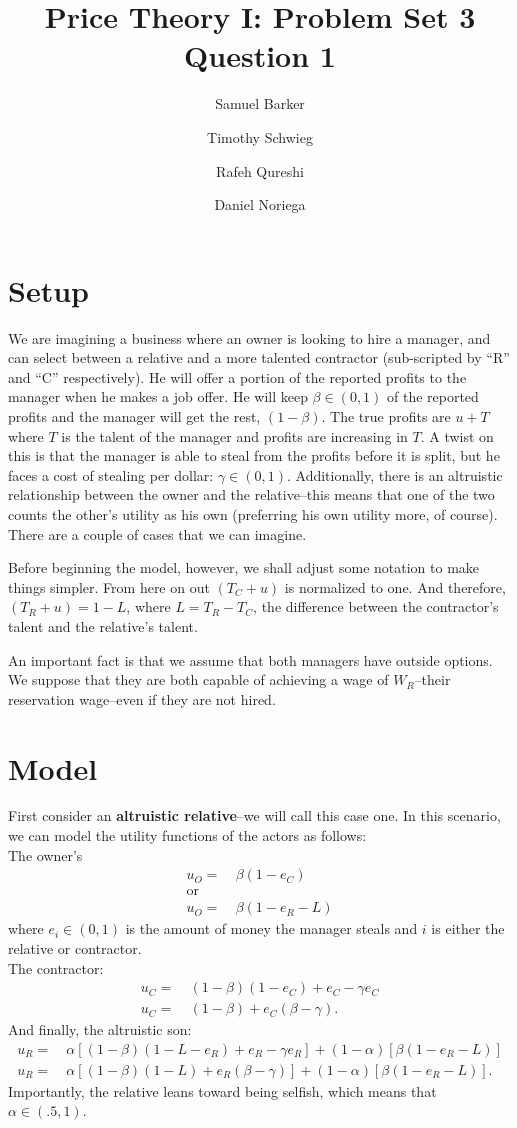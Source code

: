\documentclass[12pt]{paper}
\title{Price Theory I: Problem Set 3 Question 1}
\author{Samuel Barker\and Timothy Schwieg\and Rafeh Qureshi\and Daniel Noriega}
\begin{document}
\maketitle

\section{Setup}
We are imagining a business where an owner is looking to hire a
manager, and can select between a relative and a more talented
contractor (sub-scripted by ``R'' and ``C'' respectively). He will offer
a portion of the reported profits to the manager when he makes a job
offer. He will keep $\beta \in (0,1)$ of the reported profits and the
manager will get the rest, $(1-\beta)$. The true profits are $u+T$ where
$T$ is the talent of the manager and profits are increasing in $T$. A
twist on this is that the manager is able to steal from the profits
before it is split, but he faces a cost of stealing per dollar:
$\gamma \in (0,1)$. Additionally, there is an altruistic relationship between
the owner and the relative--this means that one of the two counts the
other's utility as his own (preferring his own utility more, of
course). There are a couple of cases that we can imagine.

Before beginning the model, however, we shall adjust some notation to
make things simpler. From here on out $(T_C+u)$ is normalized to
one. And therefore, $(T_R+u)=1-L$, where $L=T_R-T_C$, the difference
between the contractor's talent and the relative's talent.

An important fact is that we assume that both managers have outside
options. We suppose that they are both capable of achieving a wage of
$W_R$--their reservation wage--even if they are not hired.
\\

\section{Model}
First consider an \textbf{altruistic relative}--we will call this case one.
In this scenario, we can model the utility functions of the actors as follows:\\
The owner's
\begin{align*}
u_O=&~\beta(1-e_C)\\
\text{or}\\
u_O=&~\beta(1-e_R-L)
\end{align*}
where $e_i\in (0,1)$ is the amount of money the manager steals and $i$ is either the relative or contractor.\\
The contractor:
\begin{align*}
u_C=&~(1-\beta)(1-e_C)+e_C-\gamma e_C\\
u_C=&~(1-\beta)+e_C(\beta-\gamma).
\end{align*}
And finally, the altruistic son:
\begin{align*}
u_R=&~\alpha[(1-\beta)(1-L-e_R)+e_R-\gamma e_R]+(1-\alpha)[\beta(1-e_R-L)]\\
u_R=&~\alpha[(1-\beta)(1-L)+e_R(\beta-\gamma)]+(1-\alpha)[\beta(1-e_R-L)].
\end{align*}
Importantly, the relative leans toward being selfish, which means that $\alpha \in (.5,1)$.
\end{document}
